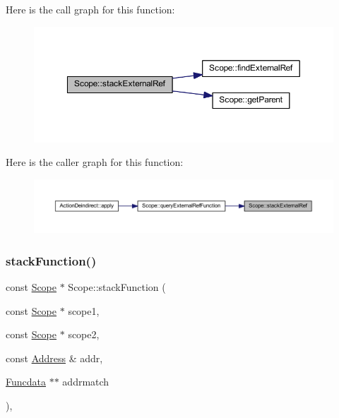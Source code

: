 Here is the call graph for this function\+:
\nopagebreak
\begin{figure}[H]
\begin{center}
\leavevmode
\includegraphics[width=350pt]{class_scope_a44898a2294de74a77dd21583ca6254e2_cgraph}
\end{center}
\end{figure}
Here is the caller graph for this function\+:
\nopagebreak
\begin{figure}[H]
\begin{center}
\leavevmode
\includegraphics[width=350pt]{class_scope_a44898a2294de74a77dd21583ca6254e2_icgraph}
\end{center}
\end{figure}
\mbox{\label{class_scope_a1e0d2e90ee5d4bc7e3dc761390be5e47}} 
\subsubsection{\texorpdfstring{stackFunction()}{stackFunction()}}
{\footnotesize\ttfamily const \mbox{\hyperlink{class_scope}{Scope}} $\ast$ Scope\+::stack\+Function (\begin{DoxyParamCaption}\item[{const \mbox{\hyperlink{class_scope}{Scope}} $\ast$}]{scope1,  }\item[{const \mbox{\hyperlink{class_scope}{Scope}} $\ast$}]{scope2,  }\item[{const \mbox{\hyperlink{class_address}{Address}} \&}]{addr,  }\item[{\mbox{\hyperlink{class_funcdata}{Funcdata}} $\ast$$\ast$}]{addrmatch }\end{DoxyParamCaption})\hspace{0.3cm}{\ttfamily [static]}, {\ttfamily [protected]}}

